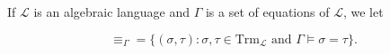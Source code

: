 If $\mathcal{L}$ is an algebraic language and $\Gamma$ is a set of equations of $\mathcal{L}$, we let

$$\equiv_\Gamma = \{(\sigma, \tau) : \sigma, \tau \in \text{Trm}_\mathcal{L} \text{ and } \Gamma \models \sigma = \tau\}.$$
